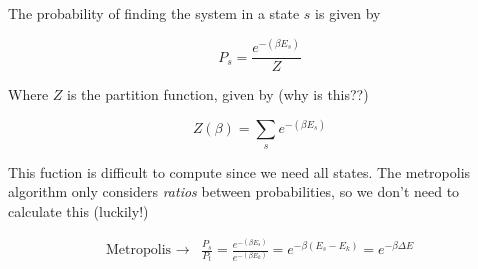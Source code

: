 \documentclass[11pt]{article}
\begin{document}
\begin{flushleft}
The probability of finding the system in a state $s$ is given by

\begin{equation}
P_s = \frac{e^{-(\beta E_s)}}{Z}
\end{equation}

Where $Z$ is the partition function, given by (why is this??)

\begin{equation}
Z(\beta) = \sum_s e^{-(\beta E_s)}
\end{equation}

This fuction is difficult to compute since we need all states. The metropolis algorithm only considers \textit{ratios} between probabilities, so we don't need to calculate this (luckily!)

\begin{align*}
\text{Metropolis } \rightarrow  &\frac{P_s}{P_t} = \frac{e^{-(\beta E_s)}}{e^{-(\beta E_k)}}
= e^{-\beta(E_s - E_k)}
= e^{-\beta \Delta E} 
\end{align*}


\end{flushleft}
\end{document}
